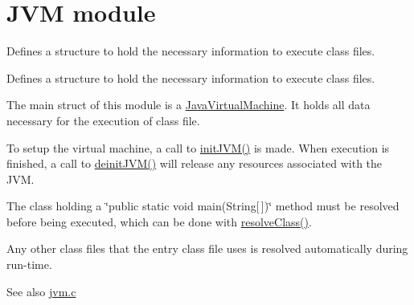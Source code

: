 \hypertarget{group__jvm}{}\section{J\+VM module}
\label{group__jvm}


Defines a structure to hold the necessary information to execute class files.  


Defines a structure to hold the necessary information to execute class files. 

The main struct of this module is a \hyperlink{structJavaVirtualMachine}{Java\+Virtual\+Machine}. It holds all data necessary for the execution of class file.

To setup the virtual machine, a call to \hyperlink{jvm_8h_aca189885e78ec25ece5d7f70e83022a1}{init\+J\+V\+M()} is made. When execution is finished, a call to \hyperlink{jvm_8h_a65269d70951aacfe829c89c078dad67a}{deinit\+J\+V\+M()} will release any resources associated with the J\+VM.

The class holding a \char`\"{}public static void main(\+String\mbox{[}$\,$\mbox{]})\char`\"{} method must be resolved before being executed, which can be done with \hyperlink{jvm_8h_afc01abbd34a25316bb3e806471ebdbeb}{resolve\+Class()}.

Any other class files that the entry class file uses is resolved automatically during run-\/time.

\begin{DoxySeeAlso}{See also}
\hyperlink{jvm_8c}{jvm.\+c} 
\end{DoxySeeAlso}
